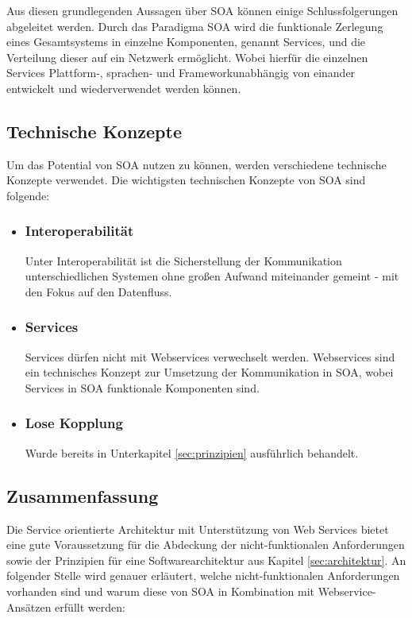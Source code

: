Aus diesen grundlegenden Aussagen über \ac{SOA} können einige Schlussfolgerungen abgeleitet werden. Durch das Paradigma \ac{SOA} wird die funktionale Zerlegung eines Gesamtsystems in einzelne Komponenten, genannt Services, und die Verteilung dieser auf ein Netzwerk ermöglicht. Wobei hierfür die einzelnen Services Plattform-, sprachen- und Frameworkunabhängig von einander entwickelt und wiederverwendet werden können\autocite[Vgl.][121\psq]{gmodse}.

\subsection{Technische Konzepte}
Um das Potential von \ac{SOA} nutzen zu können, werden verschiedene technische Konzepte verwendet. Die wichtigsten technischen Konzepte von \ac{SOA} sind folgende\autocite[Vgl.][11]{soaidp}:

\begin{itemize}
\item \subsubsection*{Interoperabilität} Unter Interoperabilität ist die Sicherstellung der Kommunikation unterschiedlichen Systemen ohne großen Aufwand miteinander gemeint - mit den Fokus auf den Datenfluss.
\item \subsubsection*{Services} Services dürfen nicht mit Webservices verwechselt werden. Webservices sind ein technisches Konzept zur Umsetzung der Kommunikation in \ac{SOA}, wobei Services in \ac{SOA} funktionale Komponenten sind\autocite[Vgl.][123\psq]{gmodse}.
\item \subsubsection*{Lose Kopplung} Wurde bereits in Unterkapitel \ref{sec:prinzipien} ausführlich behandelt.
\end{itemize}

\subsection{Zusammenfassung}
\label{ws:zf}
Die Service orientierte Architektur mit Unterstützung von Web Services bietet eine gute Voraussetzung für die Abdeckung der nicht-funktionalen Anforderungen sowie der Prinzipien für eine Softwarearchitektur aus Kapitel \ref{sec:architektur}. An folgender Stelle wird genauer erläutert, welche nicht-funktionalen Anforderungen vorhanden sind und warum diese von \ac{SOA} in Kombination mit Webservice-Ansätzen erfüllt werden:

